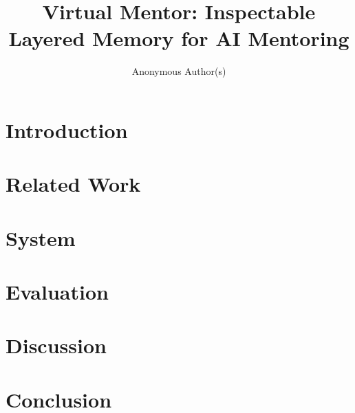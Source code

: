 \documentclass[manuscript,review,anonymous]{acmart}
\title{Virtual Mentor: Inspectable Layered Memory for AI Mentoring}
\author{Anonymous Author(s)}
\affiliation{%
  \institution{Anonymous Institution}
  \country{Anonymous Country}
}
\begin{document}
\begin{abstract}
\end{abstract}

\maketitle

\section{Introduction}

\section{Related Work}

\section{System}

\section{Evaluation}

\section{Discussion}

\section{Conclusion}



\end{document}
